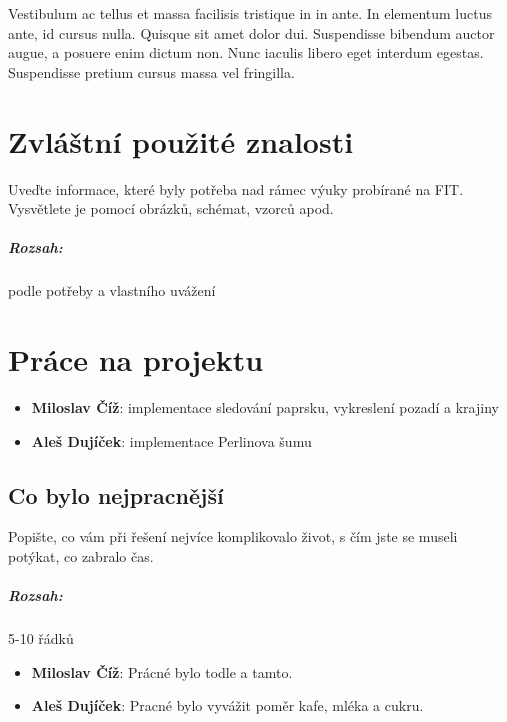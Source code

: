 \documentclass[12pt,a4paper,titlepage,final]{report}
\newcommand\AuthorA{Miloslav Číž}
\newcommand\AuthorB{Aleš Dujíček}
\begin{document}
Vestibulum ac tellus et massa facilisis tristique in in ante. In elementum luctus ante, id cursus nulla. Quisque sit amet dolor dui. Suspendisse bibendum auctor augue, a posuere enim dictum non. Nunc iaculis libero eget interdum egestas. Suspendisse pretium cursus massa vel fringilla.



\chapter{Zvláštní použité znalosti}

Uveďte informace, které byly potřeba nad rámec výuky probírané na FIT.
Vysvětlete je pomocí obrázků, schémat, vzorců apod.

\paragraph{Rozsah:} podle potřeby a vlastního uvážení


\chapter{Práce na projektu}

\begin{itemize}
\item \textbf{\AuthorA}: implementace sledování paprsku, vykreslení pozadí a krajiny
\item \textbf{\AuthorB}: implementace Perlinova šumu
\end{itemize}

\section{Co bylo nejpracnější}

Popište, co vám při řešení nejvíce komplikovalo život, s čím jste se museli
potýkat, co zabralo čas.

\paragraph{Rozsah:} 5-10 řádků

\begin{itemize}
\item \textbf{\AuthorA}: Prácné bylo todle a tamto.
\item \textbf{\AuthorB}: Pracné bylo vyvážit poměr kafe, mléka a cukru.
\end{itemize}
\end{document}
